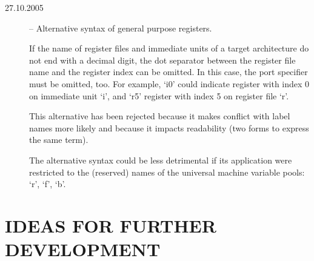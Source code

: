 \documentclass[twoside]{tce}
\begin{document}
\begin{description}
\item[27.10.2005] -- Alternative syntax of general purpose registers.

  If the name of register files and immediate units of a target architecture
  do not end with a decimal digit, the dot separator between the register
  file name and the register index can be omitted. In this case, the port
  specifier must be omitted, too.
%
  For example, `i0' could indicate register with index 0 on immediate unit
  `i', and `r5' register with index 5 on register file `r'.

  This alternative has been rejected because it makes conflict with label
  names more likely and because it impacts readability (two forms to express
  the same term).

  The alternative syntax could be less detrimental if its application were
  restricted to the (reserved) names of the universal machine variable
  pools: `r', `f', `b'.
\end{description}



\chapter{IDEAS FOR FURTHER DEVELOPMENT}
\label{sec:further-ideas}

\end{document}
